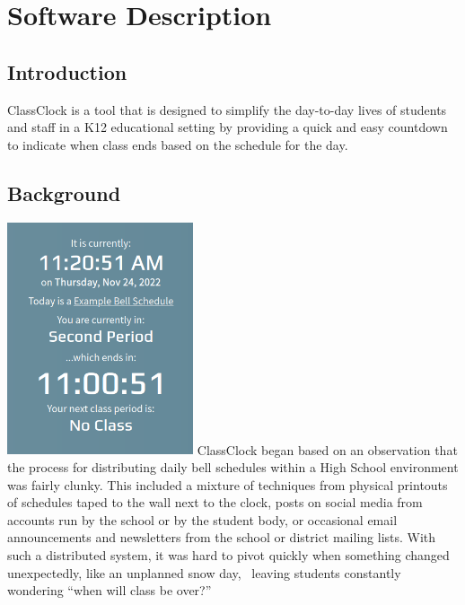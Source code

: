 \documentclass{article}
\begin{document}
\bigskip

\setcounter{tocdepth}{3}
\tableofcontents
\newpage

\section{Software Description}
\subsection{Introduction}
{ClassClock is a tool that is designed to simplify the day-to-day lives of students and staff in a K12 educational
setting by providing a quick and easy countdown to indicate when class ends based on the schedule for the day.}

\subsection{Background}
\includegraphics[width=2.1575in,height=2.6972in]{Mini20Manual-img002.png}
{ClassClock began based on an observation that the process for distributing daily bell schedules within a High School
environment was fairly clunky. This included a mixture of techniques from physical printouts of schedules taped to the
wall next to the clock, posts on social media from accounts run by the school or by the student body, or occasional
email announcements and newsletters from the school or district mailing lists. With such a distributed system, it was
hard to pivot quickly when something changed unexpectedly, like an unplanned snow day, \ leaving students constantly
wondering “when will class be over?”}
\end{document}
